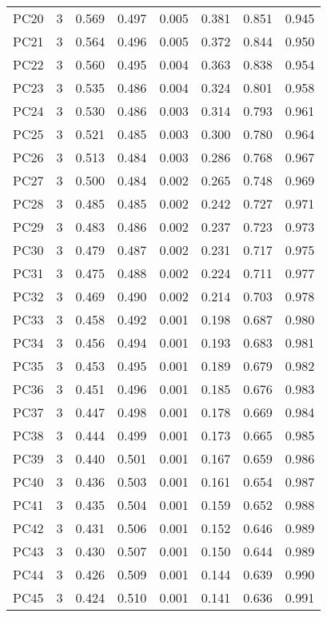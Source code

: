 \begin{table}[!htbp]
\begin{tabular}{@{\extracolsep{5pt}}lccccccc}
PC20 & 3 & 0.569 & 0.497 & 0.005 & 0.381 & 0.851 & 0.945 \\ 
PC21 & 3 & 0.564 & 0.496 & 0.005 & 0.372 & 0.844 & 0.950 \\ 
PC22 & 3 & 0.560 & 0.495 & 0.004 & 0.363 & 0.838 & 0.954 \\ 
PC23 & 3 & 0.535 & 0.486 & 0.004 & 0.324 & 0.801 & 0.958 \\ 
PC24 & 3 & 0.530 & 0.486 & 0.003 & 0.314 & 0.793 & 0.961 \\ 
PC25 & 3 & 0.521 & 0.485 & 0.003 & 0.300 & 0.780 & 0.964 \\ 
PC26 & 3 & 0.513 & 0.484 & 0.003 & 0.286 & 0.768 & 0.967 \\ 
PC27 & 3 & 0.500 & 0.484 & 0.002 & 0.265 & 0.748 & 0.969 \\ 
PC28 & 3 & 0.485 & 0.485 & 0.002 & 0.242 & 0.727 & 0.971 \\ 
PC29 & 3 & 0.483 & 0.486 & 0.002 & 0.237 & 0.723 & 0.973 \\ 
PC30 & 3 & 0.479 & 0.487 & 0.002 & 0.231 & 0.717 & 0.975 \\ 
PC31 & 3 & 0.475 & 0.488 & 0.002 & 0.224 & 0.711 & 0.977 \\ 
PC32 & 3 & 0.469 & 0.490 & 0.002 & 0.214 & 0.703 & 0.978 \\ 
PC33 & 3 & 0.458 & 0.492 & 0.001 & 0.198 & 0.687 & 0.980 \\ 
PC34 & 3 & 0.456 & 0.494 & 0.001 & 0.193 & 0.683 & 0.981 \\ 
PC35 & 3 & 0.453 & 0.495 & 0.001 & 0.189 & 0.679 & 0.982 \\ 
PC36 & 3 & 0.451 & 0.496 & 0.001 & 0.185 & 0.676 & 0.983 \\ 
PC37 & 3 & 0.447 & 0.498 & 0.001 & 0.178 & 0.669 & 0.984 \\ 
PC38 & 3 & 0.444 & 0.499 & 0.001 & 0.173 & 0.665 & 0.985 \\ 
PC39 & 3 & 0.440 & 0.501 & 0.001 & 0.167 & 0.659 & 0.986 \\ 
PC40 & 3 & 0.436 & 0.503 & 0.001 & 0.161 & 0.654 & 0.987 \\ 
PC41 & 3 & 0.435 & 0.504 & 0.001 & 0.159 & 0.652 & 0.988 \\ 
PC42 & 3 & 0.431 & 0.506 & 0.001 & 0.152 & 0.646 & 0.989 \\ 
PC43 & 3 & 0.430 & 0.507 & 0.001 & 0.150 & 0.644 & 0.989 \\ 
PC44 & 3 & 0.426 & 0.509 & 0.001 & 0.144 & 0.639 & 0.990 \\ 
PC45 & 3 & 0.424 & 0.510 & 0.001 & 0.141 & 0.636 & 0.991 \\ 

\end{tabular}
\end{table}
